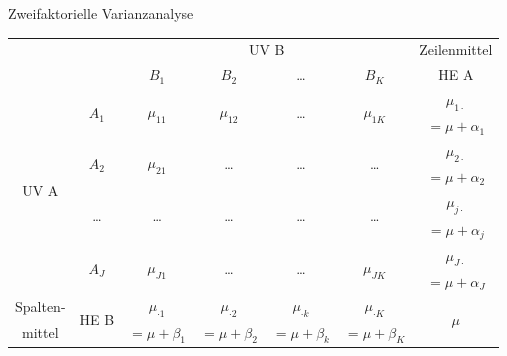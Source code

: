 \documentclass{beamer}
\begin{document}
		\begin{frame}{Zweifaktorielle Varianzanalyse}
			
			\begin{table}[]
				\centering
				\resizebox{\textwidth}{!} {
				\begin{tabular}{|cc|c|c|c|c|c|}
					\hline
					\multicolumn{2}{|c|}{\multirow{2}{*}{}}        & \multicolumn{4}{c|}{UV B}                                                                                        & Zeilenmittel           \\
					\multicolumn{2}{|c|}{}                         & $B_1$                       & $B_2$                       & \dots                  & $B_K$                       & HE A                   \\ \hline
					\multirow{8}{*}{UV A} & \multirow{2}{*}{$A_1$} & \multirow{2}{*}{$\mu_{11}$} & \multirow{2}{*}{$\mu_{12}$} & \multirow{2}{*}{\dots} & \multirow{2}{*}{$\mu_{1K}$} & $\mu_{1\cdot}$         \\
					&                        &                             &                             &                        &                             & $= \mu + \alpha_1$     \\ \cline{2-7} 
					& \multirow{2}{*}{$A_2$} & \multirow{2}{*}{$\mu_{21}$} & \multirow{2}{*}{\dots}      & \multirow{2}{*}{\dots} & \multirow{2}{*}{\dots}      & $\mu_{2\cdot}$         \\
					&                        &                             &                             &                        &                             & $= \mu + \alpha_2$     \\ \cline{2-7} 
					& \multirow{2}{*}{\dots} & \multirow{2}{*}{\dots}      & \multirow{2}{*}{\dots}      & \multirow{2}{*}{\dots} & \multirow{2}{*}{\dots}      & $\mu_{j\cdot}$         \\
					&                        &                             &                             &                        &                             & $= \mu + \alpha_j$     \\ \cline{2-7} 
					& \multirow{2}{*}{$A_J$} & \multirow{2}{*}{$\mu_{J1}$} & \multirow{2}{*}{\dots}      & \multirow{2}{*}{\dots} & \multirow{2}{*}{$\mu_{JK}$} & $\mu_{J\cdot}$         \\
					&                        &                             &                             &                        &                             & $= \mu + \alpha_J$     \\ \hline
					Spalten-              & \multirow{2}{*}{HE B}  & $\mu_{\cdot1}$              & $\mu_{\cdot2}$              & $\mu_{\cdot k}$        & $\mu_{\cdot K}$             & \multirow{2}{*}{$\mu$} \\
					mittel                &                        & $= \mu + \beta_1$           & $= \mu + \beta_2$           & $= \mu + \beta_k$      & $= \mu + \beta_K$           &                        \\ \hline
				\end{tabular}
			}
			\end{table}
		
		\end{frame}
\end{document}
